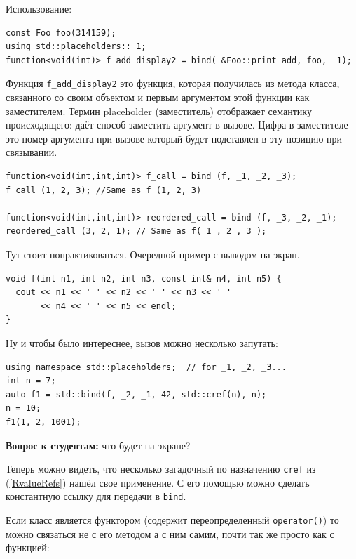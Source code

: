 \documentclass[a4paper,12pt,oneside]{article}
\newif\ifanswers
\begin{document}
Использование:

\begin{lstlisting}
const Foo foo(314159);
using std::placeholders::_1;
function<void(int)> f_add_display2 = bind( &Foo::print_add, foo, _1);
\end{lstlisting}

Функция \lstinline!f_add_display2! это функция, которая получилась из метода класса, связанного со своим объектом и первым аргументом этой функции как заместителем. Термин placeholder (заместитель) отображает семантику происходящего: даёт способ заместить аргумент в вызове. Цифра в заместителе это номер аргумента при вызове который будет подставлен в эту позицию при связывании.

\begin{lstlisting}
function<void(int,int,int)> f_call = bind (f, _1, _2, _3);
f_call (1, 2, 3); //Same as f (1, 2, 3)

function<void(int,int,int)> reordered_call = bind (f, _3, _2, _1);
reordered_call (3, 2, 1); // Same as f( 1 , 2 , 3 );
\end{lstlisting}

Тут стоит попрактиковаться. Очередной пример с выводом на экран.

\begin{lstlisting}
void f(int n1, int n2, int n3, const int& n4, int n5) {
  cout << n1 << ' ' << n2 << ' ' << n3 << ' ' 
       << n4 << ' ' << n5 << endl;
}
\end{lstlisting}

Ну и чтобы было интереснее, вызов можно несколько запутать:

\begin{lstlisting}
using namespace std::placeholders;  // for _1, _2, _3...
int n = 7;
auto f1 = std::bind(f, _2, _1, 42, std::cref(n), n);
n = 10;
f1(1, 2, 1001); 
\end{lstlisting}

\textbf{Вопрос к студентам:} что будет на экране?

\ifanswers
Первый аргумент \lstinline!f1! привязан к \lstinline!n2!, второй к \lstinline!n1!, третий 42, четвертый \lstinline!n! по ссылке, то есть 10, пятый \lstinline!n! по значению то есть 7, а аргумент 1001 не использован вообще.
\fi

Теперь можно видеть, что несколько загадочный по назначению \lstinline!cref! из (\ref{RvalueRefs}) нашёл свое применение. С его помощью можно сделать константную ссылку для передачи в \lstinline!bind!.

Если класс является функтором (содержит переопределенный \lstinline!operator()!) то можно связаться не с его методом а с ним самим, почти так же просто как с функцией:
\end{document}
